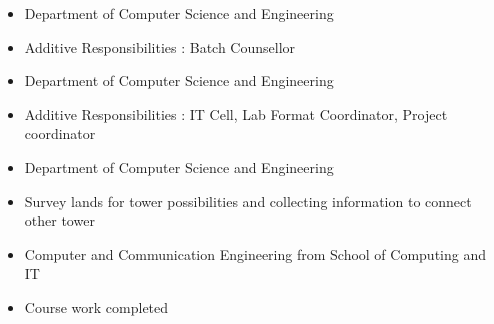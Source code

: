 \documentclass[10pt,a4paper,ragged2e,withhyper]{altacv}
\begin{document}
\begin{paracol}{2}


\begin{itemize}
\item Department of Computer Science and Engineering
\item Additive Responsibilities : Batch Counsellor
\end{itemize}

\divider

\begin{itemize}
\item Department of Computer Science and Engineering
\item Additive Responsibilities : IT Cell, Lab Format Coordinator, Project coordinator
\end{itemize}

\divider

\begin{itemize}
\item Department of Computer Science and Engineering
\end{itemize}

\divider

\begin{itemize}
\item Survey lands for tower possibilities and collecting information to connect other tower
\end{itemize}


\divider


\begin{itemize}
\item Computer and Communication Engineering from School of Computing and IT
\item Course work completed
\end{itemize}


\end{paracol}
\end{document}
